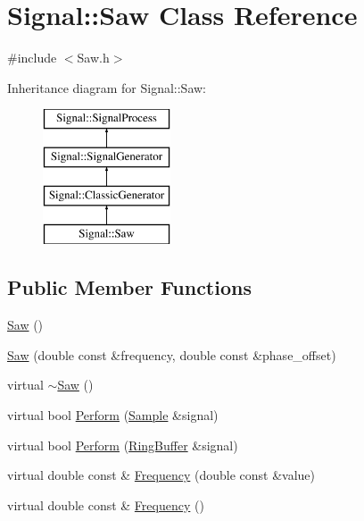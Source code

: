 \hypertarget{class_signal_1_1_saw}{\section{Signal\+:\+:Saw Class Reference}
\label{class_signal_1_1_saw}
}


{\ttfamily \#include $<$Saw.\+h$>$}

Inheritance diagram for Signal\+:\+:Saw\+:\begin{figure}[H]
\begin{center}
\leavevmode
\includegraphics[height=4.000000cm]{class_signal_1_1_saw}
\end{center}
\end{figure}
\subsection*{Public Member Functions}
\begin{DoxyCompactItemize}
\item 
\hyperlink{class_signal_1_1_saw_a4bce6f687d2bd26aa3c2fb209de4c9f9}{Saw} ()
\item 
\hyperlink{class_signal_1_1_saw_a6d772ec845a8c98a4111a7bf1ddabb10}{Saw} (double const \&frequency, double const \&phase\+\_\+offset)
\item 
virtual \hyperlink{class_signal_1_1_saw_a1663e993e22dd1f66033c4de1c1007e9}{$\sim$\+Saw} ()
\item 
virtual bool \hyperlink{class_signal_1_1_saw_a6fb3216b94fea4daa83b27f5de194fa0}{Perform} (\hyperlink{class_signal_1_1_sample}{Sample} \&signal)
\item 
virtual bool \hyperlink{class_signal_1_1_saw_a0d0d374c9b5a3f73f48e9fb1c444b0ca}{Perform} (\hyperlink{class_signal_1_1_ring_buffer}{Ring\+Buffer} \&signal)
\item 
virtual double const \& \hyperlink{class_signal_1_1_saw_af91fd0d15b380c02e309705eaad46efd}{Frequency} (double const \&value)
\item 
virtual double const \& \hyperlink{class_signal_1_1_saw_acf3fd0346394d9fd2690bb5fee9550f6}{Frequency} ()
\end{DoxyCompactItemize}
